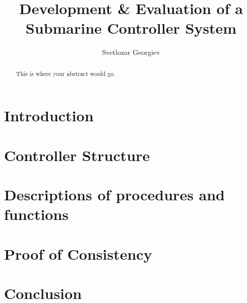 \documentclass{llncs}
\begin{document}
\author{Svetlozar Georgiev}
\title{Development \& Evaluation of a Submarine Controller System}

\maketitle

\begin{abstract}
	This is where your abstract would go.
\end{abstract}

\section{Introduction}
\section{Controller Structure}
\section{Descriptions of procedures and functions}
\section{Proof of Consistency}
\section{Conclusion}
\end{document}

